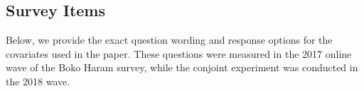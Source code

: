 \vspace{3mm}
\begin{table}[H]
\caption{Overview of Sample Size Across Survey Waves}
\label{tab:art2-app-tab2}
\onehalfspacing
{}
\end{table}
\newpage


\subsection{Survey Items}
\label{app:C13}
Below, we provide the exact question wording and response options for the covariates used in the paper. These questions were measured in the 2017 online wave of the Boko Haram survey, while the conjoint experiment was conducted in the 2018 wave.

